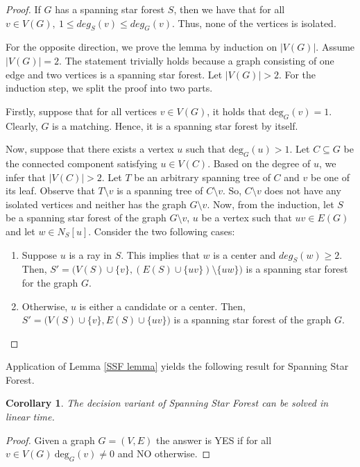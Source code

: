 \documentclass[en]{pracamgr}
\newtheorem{corollary}{Corollary}
\theoremstyle{definition}
\newcommand{\ssf}{spanning star forest}
\newcommand{\ssfp}{{\sc Spanning Star Forest}}
\newcommand{\degree}[2]{\textrm{deg}_{#1}(#2)}
\begin{document}
\begin{proof}
	If $G$ has a \ssf{} $S$, then we have that for all $v \in V(G),\ 1 \leq deg_S(v) \leq deg_G(v)$. Thus, none of the vertices is isolated.
	
	For the opposite direction, we prove the lemma by induction on $|V(G)|$. Assume $|V(G)|=2$. The statement trivially holds because a graph consisting of one edge and two vertices is a \ssf{}. Let $|V(G)| >2$. For the induction step, we split the proof into two parts. 
	
	Firstly, suppose that for all vertices $v \in V(G)$, it holds that $\degree{G}{v}=1$.  Clearly, $G$ is a matching. Hence, it is a \ssf{} by itself. 
	
	Now, suppose that there exists a vertex $u$ such that $\degree{G}{u}>1$. Let $C \subseteq G$ be the connected component satisfying $u \in V(C)$. Based on the degree of $u$, we infer that $|V(C)|>2$. Let $T$ be an arbitrary spanning tree of $C$ and $v$ be one of its leaf. Observe that $T \setminus v$ is a spanning tree of $C \setminus v$. So, $C \setminus v$ does not have any isolated vertices and neither has the graph $G \setminus v$. Now, from the induction, let $S$ be a \ssf{} of the graph $G \setminus v$, $u$ be a vertex such that $uv \in E(G)$ and let $w \in N_S[u]$. Consider the two following cases:
	\begin{enumerate}
		\item Suppose $u$ is a ray in $S$. This implies that $w$ is a center and $deg_S(w) \geq 2$. Then, $S'=\big(V(S) \cup \{v\},(E(S) \cup \{uv\}) \setminus \{uw\}\big)$ is a spanning star forest for the graph $G$.
		\item Otherwise, $u$ is either a candidate or a center. Then, $S'=\big(V(S) \cup \{v\}, E(S) \cup \{uv\}\big)$ is a spanning star forest of the graph $G$. \qedhere
	\end{enumerate}
	
\end{proof}

Application of Lemma \ref{SSF lemma} yields the following result for \ssfp{}.

\begin{corollary}
	The decision variant of \ssfp{} can be solved in linear time.
\end{corollary}

\begin{proof}
	Given a graph $G = (V,E)$ the answer is YES if for all $v \in V(G)\ \degree{G}{v} \neq 0$ and NO otherwise.
\end{proof}
\end{document}
